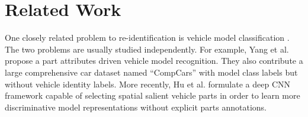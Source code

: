 \documentclass[10pt,twocolumn,letterpaper]{article}
\newcommand{\todo}[1]{}
\renewcommand{\todo}[1]{{\color{red} TODO: {#1}}}
\begin{document}
%

\section{Related Work}

One closely related problem to re-identification is vehicle model
classification
\cite{liao2015exploiting,yang2015compcars,sochor2016boxcars,hu2017deep}.
The two problems are usually studied independently.
For example, Yang et al. \cite{yang2015compcars} propose a part attributes driven
vehicle model recognition.
They also contribute a large comprehensive car dataset named ``CompCars''
with model class labels but without vehicle identity labels.
More recently, Hu et al. \cite{hu2017deep} formulate a deep CNN framework capable of
selecting spatial salient vehicle parts in order to learn more
discriminative model representations without explicit parts annotations.
\end{document}
